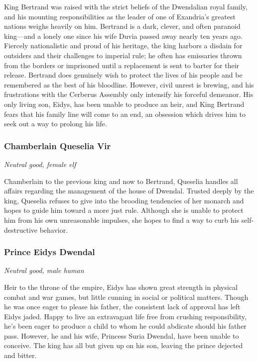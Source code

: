 \documentclass[10pt,a4paper,twoside,bg=print,twocolumn,openany,nodeprecatedcode]{dndbook}
\begin{document}
King Bertrand was raised with the strict beliefs of the Dwendalian royal family, and his mounting responsibilities as the leader of one of Exandria's greatest nations weighs heavily on him. Bertrand is a dark, clever, and often paranoid king—and a lonely one since his wife Duvia passed away nearly ten years ago. Fiercely nationalistic and proud of his heritage, the king harbors a disdain for outsiders and their challenges to imperial rule; he often has emissaries thrown from the borders or imprisoned until a replacement is sent to barter for their release. Bertrand does genuinely wish to protect the lives of his people and be remembered as the best of his bloodline. However, civil unrest is brewing, and his frustrations with the Cerberus Assembly only intensify his forceful demeanor. His only living son, Eidys, has been unable to produce an heir, and King Bertrand fears that his family line will come to an end, an obsession which drives him to seek out a way to prolong his life.

\subsubsection{Chamberlain Queselia Vir}
\textit{Neutral good, female elf}

Chamberlain to the previous king and now to Bertrand, Queselia handles all affairs regarding the management of the house of Dwendal. Trusted deeply by the king, Queselia refuses to give into the brooding tendencies of her monarch and hopes to guide him toward a more just rule. Although she is unable to protect him from his own unreasonable impulses, she hopes to find a way to curb his self-destructive behavior.

\subsubsection{Prince Eidys Dwendal}
\textit{Neutral good, male human}

Heir to the throne of the empire, Eidys has shown great strength in physical combat and war games, but little cunning in social or political matters. Though he was once eager to please his father, the consistent lack of approval has left Eidys jaded. Happy to live an extravagant life free from crushing responsibility, he's been eager to produce a child to whom he could abdicate should his father pass. However, he and his wife, Princess Suria Dwendal, have been unable to conceive. The king has all but given up on his son, leaving the prince dejected and bitter.
\end{document}
